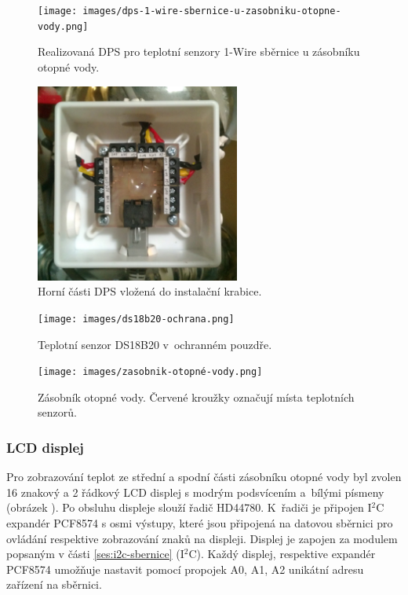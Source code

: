 \begin{figure}[H]
    \centering
    \texttt{[image: images/dps-1-wire-sbernice-u-zasobniku-otopne-vody.png]}
    \caption{Realizovaná DPS pro teplotní senzory 1-Wire sběrnice u zásobníku otopné vody.}
    \label{fig:dps-1-wire-sbernice-u-zasobniku-otopne-vody}
\end{figure}

\begin{figure}[H]
    \centering
    \includegraphics[width=0.6\textwidth]{images/instalacni-krabice-cidla-u-zasobniku-otopne-vody.png}
    \caption{Horní části DPS vložená do instalační krabice.}
    \label{fig:instalacni-krabice-cidla-u-zasobniku-otopne-vody}
\end{figure}

\begin{figure}[H]
    \centering
    \texttt{[image: images/ds18b20-ochrana.png]}
    \caption{Teplotní senzor DS18B20 v~ochranném pouzdře.}
    \label{fig:ds18b20-ochrana}
\end{figure}

\begin{figure}[H]
    \centering
    \texttt{[image: images/zasobnik-otopné-vody.png]}
    \caption[Zásobník otopné vody.]{Zásobník otopné vody. Červené kroužky označují místa teplotních senzorů.}
    \label{fig:zasobnik-otopné-vody}
\end{figure}


\subsubsection{LCD displej}
Pro zobrazování teplot ze střední a spodní části zásobníku otopné vody byl zvolen 16 znakový a 2 řádkový LCD displej s modrým podsvícením a~bílými písmeny (obrázek ). Po obsluhu displeje slouží řadič HD44780. K~řadiči je připojen I$^2$C expandér PCF8574 s osmi výstupy, které jsou připojená na datovou sběrnici pro ovládání respektive zobrazování znaků na displeji. Displej je zapojen za modulem popsaným v části \ref{ses:i2c-sbernice} (I$^2$C). Každý displej, respektive expandér PCF8574 umožňuje nastavit pomocí propojek A0, A1, A2 unikátní adresu zařízení na sběrnici.


